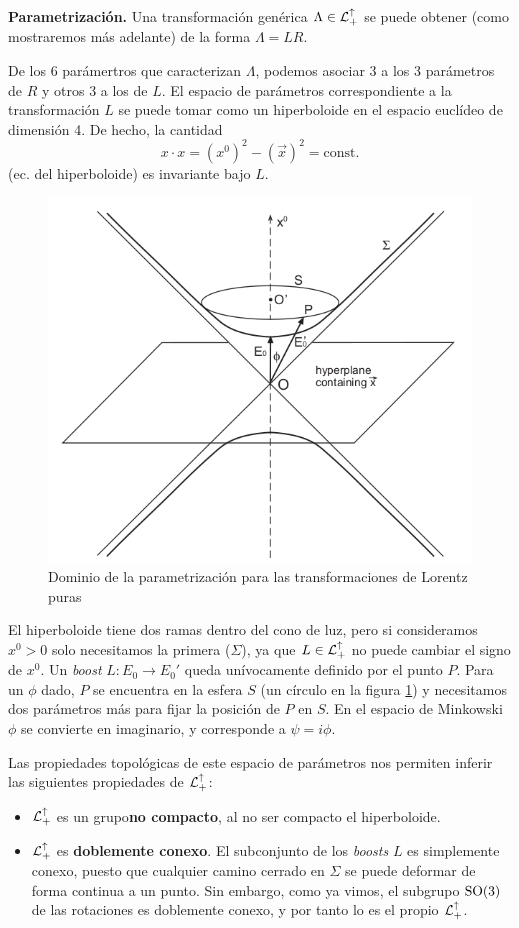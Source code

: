 \begin{flushleft}
\textbf{Parametrización.} Una transformación genérica $\Lambda\in \mathcal{L}_+^\uparrow$ se puede obtener (como mostraremos más adelante) de la forma $\Lambda=LR$.
\end{flushleft}

De los 6 parámertros que caracterizan $\Lambda$, podemos asociar 3 a los 3 parámetros de $R$ y otros 3 a los de $L$. El espacio de parámetros correspondiente a la transformación $L$ se puede tomar como un hiperboloide en el espacio euclídeo de dimensión 4. De hecho, la cantidad
\begin{equation}
x\cdot x=(x^0)^2-(\vec{x})^2=\text{const.}
\end{equation}
(ec. del hiperboloide) es invariante bajo $L$.


\begin{figure}[ht]
    \centering
    \includegraphics[width=  0.4\linewidth]{hyperboloid_boosts.png}
    \caption[Dominio de la parametrización para las transformaciones de Lorentz puras]{Dominio de la parametrización para las transformaciones de Lorentz puras \footnotemark}
    \label{fig:hiperboloide_boosts}
\end{figure}


El hiperboloide tiene dos ramas dentro del cono de luz, pero si consideramos $x^0>0$ solo necesitamos la primera ($\Sigma$), ya que $L\in\mathcal{L}_+^\uparrow$ no puede cambiar el signo de $x^0$. Un \emph{boost} $L:E_0\rightarrow E_0'$ queda unívocamente definido por el punto $P$. Para un $\phi$ dado, $P$ se encuentra en la esfera $S$ (un círculo en la figura \ref{fig:hiperboloide_boosts}) y necesitamos dos parámetros más para fijar la posición de $P$ en $S$. En el espacio de Minkowski $\phi$ se convierte en imaginario, y corresponde a $\psi=i\phi$. \medskip



Las propiedades topológicas de este espacio de parámetros nos permiten inferir las siguientes propiedades de $\mathcal{L}_+^\uparrow$:
\begin{itemize}
\item $\mathcal{L}_+^\uparrow$ es un grupo\textbf{no compacto}, al no ser compacto el hiperboloide.
\item $\mathcal{L}_+^\uparrow$ es \textbf{doblemente conexo}. El subconjunto de los \emph{boosts} $L$ es simplemente conexo, puesto que cualquier camino cerrado en $\Sigma$ se puede deformar de forma continua a un punto. Sin embargo, como ya vimos, el subgrupo $\mathrm{SO}(3)$ de las rotaciones es doblemente conexo, y por tanto lo es el propio $\mathcal{L}_+^\uparrow$. 
\end{itemize} 

